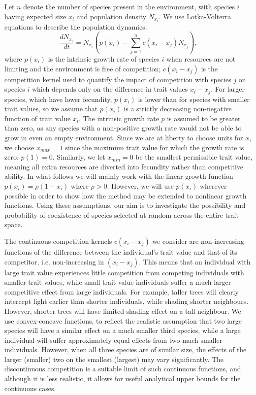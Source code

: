 Let $n$ denote the number of species present in the environment, with species $i$ having expected size $x_i$ and population density $N_{x_i}$. We use Lotka-Volterra equations to describe the population dynamics:
 \begin{equation}
\label{model}
 \frac{d N_{x_i}}{dt}=N_{x_i}\left( p(x_i) - \sum_{j=1}^n c(x_i - x_j)N_{x_j}\right),
 \end{equation}
where $p(x_i)$ is the intrinsic growth rate of species $i$ when resources are not limiting and the environment is free of competition;  $c(x_i-x_j)$ is the competition kernel used to quantify the impact of competition with species $j$ on species $i$ which depends only on the difference in trait values $x_i-x_j$. For larger species, which have lower fecundity, $p(x_i)$ is lower than for species with smaller trait values, so we assume that  $p(x_i)$ is a strictly decreasing non-negative function of trait value  $x_i$. The intrinsic growth rate $p$ is assumed to be greater than zero, as any species with a non-positive growth rate would not be able to grow in even an empty environment. Since we are at liberty to choose units for $x$, we choose $x_{max}=1$ since the maximum trait value for which the growth rate is zero: $p(1)=0$. Similarly, we let $x_{min}=0$ be the smallest permissible trait value, meaning all extra resources are diverted into fecundity rather than competitive ability. In what follows we will mainly work with the linear growth function  $p(x_i)=\rho(1- x_i)$ where $\rho>0$. However, we will use $ p(x_i)$ wherever possible in order to show how the method may be extended to nonlinear growth functions. Using these assumptions, our aim is to investigate the possibility and probability of coexistence of species selected at random across the entire trait-space.

The continuous competition kernels $c(x_i - x_j)$ we consider are non-increasing functions of the difference between the individual's trait value and that of its competitor, i.e. non-increasing in $(x_i-x_j)$. This means that an individual with large trait value experiences little competition from competing individuals with smaller trait values, while small trait value individuals suffer a much larger competitive effect from large individuals. For example, taller trees will clearly intercept light earlier than shorter individuals, while shading shorter neighbours. However, shorter trees will have limited shading effect on a tall neighbour. We use convex-concave functions, to reflect the realistic assumption that two large species will have a similar effect on a much smaller third species, while a large individual will suffer approximately equal effects from two much smaller individuals. However, when all three species are of similar size, the effects of the larger (smaller) two on the smallest (largest) may vary significantly. The discontinuous competition is a suitable limit of such continuous functions, and although it is less realistic, it allows for useful analytical upper bounds for the continuous cases.

